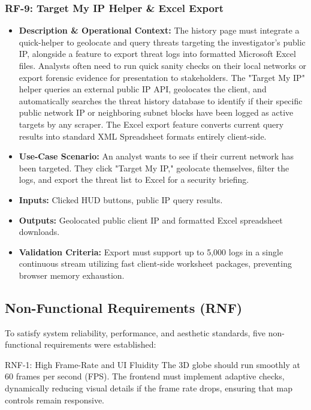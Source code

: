 \subsubsection{RF-9: Target My IP Helper \& Excel Export}
\begin{itemize}
    \item \textbf{Description \& Operational Context:} The history page must integrate a quick-helper to geolocate and query threats targeting the investigator's public IP, alongside a feature to export threat logs into formatted Microsoft Excel files. Analysts often need to run quick sanity checks on their local networks or export forensic evidence for presentation to stakeholders. The "Target My IP" helper queries an external public IP API, geolocates the client, and automatically searches the threat history database to identify if their specific public network IP or neighboring subnet blocks have been logged as active targets by any scraper. The Excel export feature converts current query results into standard XML Spreadsheet formats entirely client-side.
    \item \textbf{Use-Case Scenario:} An analyst wants to see if their current network has been targeted. They click "Target My IP," geolocate themselves, filter the logs, and export the threat list to Excel for a security briefing.
    \item \textbf{Inputs:} Clicked HUD buttons, public IP query results.
    \item \textbf{Outputs:} Geolocated public client IP and formatted Excel spreadsheet downloads.
    \item \textbf{Validation Criteria:} Export must support up to 5,000 logs in a single continuous stream utilizing fast client-side worksheet packages, preventing browser memory exhaustion.
\end{itemize}

\subsection{Non-Functional Requirements (RNF)}
To satisfy system reliability, performance, and aesthetic standards, five non-functional requirements were established:

\begin{subsubsection}{RNF-1: High Frame-Rate and UI Fluidity}
The 3D globe should run smoothly at 60 frames per second (FPS). The frontend must implement adaptive checks, dynamically reducing visual details if the frame rate drops, ensuring that map controls remain responsive.
\end{subsubsection}

